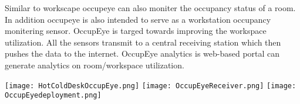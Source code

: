 Similar to workscape occupeye can also moniter the occupancy status of a room. In addition occupeye is also intended to serve as a workstation occupancy monitering sensor.
OccupEye is targed towards improving the workspace utilization.
All the sensors transmit to a central receiving station which then pushes the data to the internet. OccupEye analytics is web-based portal can generate analytics on room/workspace utilization.

\texttt{[image: HotColdDeskOccupEye.png]}
\texttt{[image: OccupEyeReceiver.png]}
\texttt{[image: OccupEyedeployment.png]}